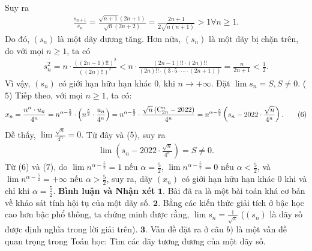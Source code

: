 \begin{multicols}{2}
	Suy ra
	\begin{align*}
		\frac{{{s_{n + 1}}}}{{{s_n}}} = \frac{{\sqrt {n + 1} \left( {2n + 1} \right)}}{{\sqrt n \left( {2n + 2} \right)}} = \frac{{2n + 1}}{{2\sqrt {n\left( {n + 1} \right)} }} > 1\forall n \ge 1.
	\end{align*}
	Do đó, $(s_n)$  là một dãy dương tăng.
	\vskip 0.05cm
	Hơn nữa, $(s_n)$  là một dãy bị chặn trên, do với mọi $n \ge  1$, ta có
	\begin{align*}
		s_n^2 = n \cdot \frac{{{{\left( {\left( {2n - 1} \right)!!} \right)}^2}}}{{{{\left( {\left( {2n} \right)!!} \right)}^2}}} < n \cdot \frac{{\left( {2n - 1} \right)!! \cdot \left( {2n} \right)!!}}{{\left( {2n} \right)!! \cdot \left( {3 \cdot 5 \cdot  \cdots  \cdot \left( {2n + 1} \right)} \right)}} = \frac{n}{{2n + 1}} < \frac{1}{2}.
	\end{align*}
	Vì vậy, $(s_n)$  có giới hạn hữu hạn khác $0$, khi $n \to +\infty$.  Đặt $\lim {s_n} = S,   S \ne  0$.  \hfill                                 ($5$)
	\vskip 0.05cm
	Tiếp theo, với mọi $n \ge  1$, ta có:
	\begin{align*}
		{x_n} = \frac{{{n^\alpha } \cdot {u_n}}}{{{4^n}}} = {n^{\alpha  - \frac{5}{2}}} \cdot \left( {{n^{\frac{5}{2}}} \cdot \frac{{{u_n}}}{{{4^n}}}} \right) = {n^{\alpha  - \frac{5}{2}}} \cdot \frac{{\sqrt n \left( {{\rm{C}}_{2n}^n - 2022} \right)}}{{{4^n}}} = {n^{\alpha  - \frac{5}{2}}}\left( {{s_n} - 2022 \cdot \frac{{\sqrt n }}{{{4^n}}}} \right). \tag{$6$}
	\end{align*}
	Dễ thấy, $\lim \frac{{\sqrt n }}{{{4^n}}} = 0.$  Từ đây và ($5$), suy ra
	\begin{align*}
		\lim \left( {{s_n} - 2022 \cdot \frac{{\sqrt n }}{{{4^n}}}} \right) = S \ne 0. \tag{$7$}
	\end{align*}
	Từ ($6$) và ($7$), do $\lim {n^{\alpha  - \frac{5}{2}}} = 1$  nếu $\alpha  = \frac{5}{2}$, $\lim {n^{\alpha  - \frac{5}{2}}} = 0$  nếu  $\alpha  < \frac{5}{2}$, và $\lim {n^{\alpha  - \frac{5}{2}}} =  + \infty $  nếu  $\alpha  > \frac{5}{2}$, suy ra, dãy $(x_n)$  có giới hạn hữu hạn khác $0$ khi và chỉ khi  $\alpha  = \frac{5}{2}$.
	\vskip 0.05cm
	\textbf{Bình luận và Nhận xét}
	\vskip 0.05cm
	$\pmb{1.}$ Bài đã ra là một bài toán khá cơ bản về khảo sát tính hội tụ của một dãy số.
	\vskip 0.05cm
	$\pmb{2.}$ Bằng các kiến thức giải tích ở bậc học cao hơn bậc phổ thông, ta chứng minh được rằng, $\lim {s_n} = \frac{1}{{\sqrt \pi  }}$   ($(s_n)$  là dãy số được định nghĩa trong lời giải trên).
	\vskip 0.05cm
	$\pmb{3.}$ Vấn đề đặt ra ở câu $b)$ là một vấn đề quan trọng trong Toán học: Tìm các dãy tương đương của một dãy số.

\end{multicols}
